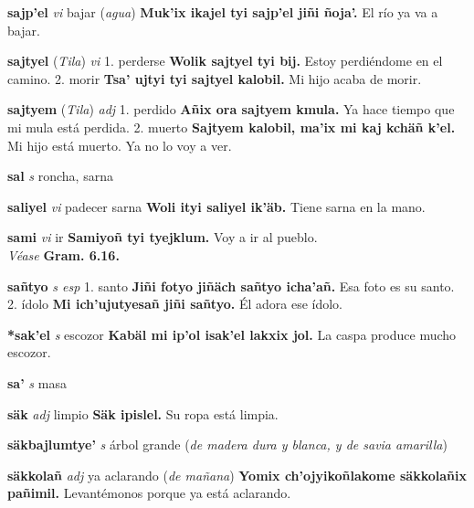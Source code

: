 \documentclass[10pt]{scrbook}
\newcommand{\entry}[1]{\textbf{#1}}
\newcommand{\onedefinition}[1]{#1.}
\newcommand{\partofspeech}[1]{\textit{#1}}
\newcommand{\spanishtranslation}[1]{#1}
\newcommand{\clarification}[1]{(\textit{#1})}
\newcommand{\cholexample}[1]{\textbf{#1}}
\newcommand{\exampletranslation}[1]{#1}
\newcommand{\alsosee}[1]{\\\textit{Véase} \textbf{#1}}
\newcommand{\relevantdialect}[1]{(\textit{#1})}
\begin{document}
\begin{multicols}{2}
\entry{sajp'el}
\partofspeech{vi}
\spanishtranslation{bajar}
\clarification{agua}
\cholexample{Muk'ix ikajel tyi sajp'el jiñi ñoja'.}
\exampletranslation{El río ya va a bajar.}

\entry{sajtyel}
\relevantdialect{Tila}
\partofspeech{vi}
\onedefinition{1}
\spanishtranslation{perderse}
\cholexample{Wolik sajtyel tyi bij.}
\exampletranslation{Estoy perdiéndome en el camino.}
\onedefinition{2}
\spanishtranslation{morir}
\cholexample{Tsa' ujtyi tyi sajtyel kalobil.}
\exampletranslation{Mi hijo acaba de morir.}

\entry{sajtyem}
\relevantdialect{Tila}
\partofspeech{adj}
\onedefinition{1}
\spanishtranslation{perdido}
\cholexample{Añix ora sajtyem kmula.}
\exampletranslation{Ya hace tiempo que mi mula está perdida.}
\onedefinition{2}
\spanishtranslation{muerto}
\cholexample{Sajtyem kalobil, ma'ix mi kaj kchäñ k'el.}
\exampletranslation{Mi hijo está muerto. Ya no lo voy a ver.}

\entry{sal}
\partofspeech{s}
\spanishtranslation{roncha, sarna}

\entry{saliyel}
\partofspeech{vi}
\spanishtranslation{padecer sarna}
\cholexample{Woli ityi saliyel ik'äb.}
\exampletranslation{Tiene sarna en la mano.}

\entry{sami}
\partofspeech{vi}
\spanishtranslation{ir}
\cholexample{Samiyoñ tyi tyejklum.}
\exampletranslation{Voy a ir al pueblo.}
\alsosee{Gram. 6.16.}

\entry{sañtyo}
\partofspeech{s esp}
\onedefinition{1}
\spanishtranslation{santo}
\cholexample{Jiñi fotyo jiñäch sañtyo icha'añ.}
\exampletranslation{Esa foto es su santo.}
\onedefinition{2}
\spanishtranslation{ídolo}
\cholexample{Mi ich'ujutyesañ jiñi sañtyo.}
\exampletranslation{Él adora ese ídolo.}

\entry{*sak'el}
\partofspeech{s}
\spanishtranslation{escozor}
\cholexample{Kabäl mi ip'ol isak'el lakxix jol.}
\exampletranslation{La caspa produce mucho escozor.}

\entry{sa'}
\partofspeech{s}
\spanishtranslation{masa}

\entry{säk}
\partofspeech{adj}
\spanishtranslation{limpio}
\cholexample{Säk ipislel.}
\exampletranslation{Su ropa está limpia.}

\entry{säkbajlumtye'}
\partofspeech{s}
\spanishtranslation{árbol grande}
\clarification{de madera dura y blanca, y de savia amarilla}

\entry{säkkolañ}
\partofspeech{adj}
\spanishtranslation{ya aclarando}
\clarification{de mañana}
\cholexample{Yomix ch'ojyikoñlakome säkkolañix pañimil.}
\exampletranslation{Levantémonos porque ya está aclarando.}


\end{multicols}
\end{document}
